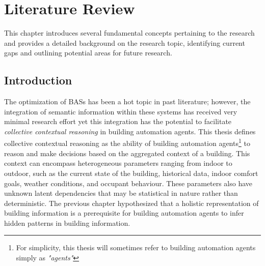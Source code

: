 \chapter{Literature Review}
\label{chap:Literature Review}

This chapter introduces several fundamental concepts pertaining to the research and provides a detailed background on the research topic, identifying current gaps and outlining potential areas for future research. 

\section{Introduction}
 The optimization of \acfp{BAS} has been a hot topic in past literature; however, the integration of semantic information within these systems has received very minimal research effort yet this integration has the potential to facilitate \textit{collective contextual reasoning} in building automation agents. This thesis defines collective contextual reasoning as the ability of building automation agents\footnote{For simplicity, this thesis will sometimes refer to building automation agents simply as \textit{"agents"}} to reason and make decisions based on the aggregated context of a building. This context can encompass heterogeneous parameters ranging from indoor to outdoor, such as the current state of the building, historical data, indoor comfort goals, weather conditions, and occupant behaviour. These parameters also have unknown latent dependencies that may be statistical in nature rather than deterministic. The previous chapter hypothesized that a holistic representation of building information is a prerequisite for building automation agents to infer hidden patterns in building information.

